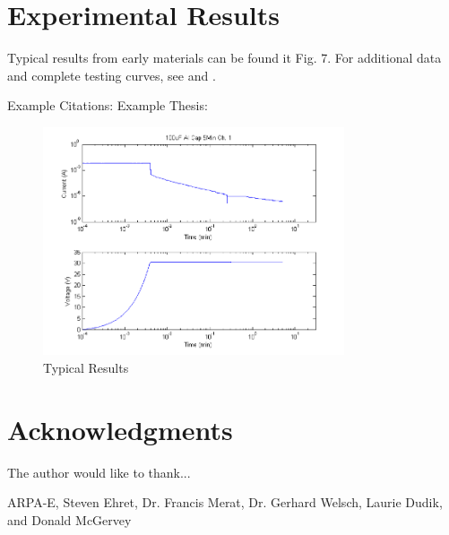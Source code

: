 \documentclass[journal]{IEEEtran}
\begin{document}
\section{Experimental Results}
Typical results from early materials can be found it Fig. 7. For additional data and complete testing curves, see \cite{sThesis} and \cite{mThesis}.

Example Citations:
Example Thesis: \cite{IEEEexample:masters}


\begin{figure}[here]
\centering
\includegraphics[width=3.5in]{measData}
\caption{Typical Results}
\label{fig:measData}
\end{figure}

\section*{Acknowledgments}

The author would like to thank...

ARPA-E,
Steven Ehret,
Dr. Francis Merat,
Dr. Gerhard Welsch,
Laurie Dudik,
and Donald McGervey

\ifCLASSOPTIONcaptionsoff
\newpage
\fi



\end{document}
